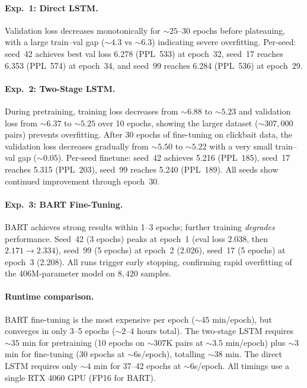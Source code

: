\documentclass{article}
\begin{document}
\paragraph{Exp.~1: Direct LSTM.}
Validation loss decreases monotonically for ${\sim}25$--30 epochs before plateauing, with a large train--val gap (${\sim}4.3$ vs ${\sim}6.3$) indicating severe overfitting.
Per-seed: seed~42 achieves best val loss 6.278 (PPL~533) at epoch~32, seed~17 reaches 6.353 (PPL~574) at epoch~34, and seed~99 reaches 6.284 (PPL~536) at epoch~29.

\paragraph{Exp.~2: Two-Stage LSTM.}
During pretraining, training loss decreases from ${\sim}6.88$ to ${\sim}5.23$ and validation loss from ${\sim}6.37$ to ${\sim}5.25$ over 10 epochs, showing the larger dataset (${\sim}307{,}000$ pairs) prevents overfitting.
After 30 epochs of fine-tuning on clickbait data, the validation loss decreases gradually from ${\sim}5.50$ to ${\sim}5.22$ with a very small train--val gap (${\sim}0.05$).
Per-seed finetune: seed~42 achieves 5.216 (PPL~185), seed~17 reaches 5.315 (PPL~203), seed~99 reaches 5.240 (PPL~189).
All seeds show continued improvement through epoch~30.

\paragraph{Exp.~3: BART Fine-Tuning.}
BART achieves strong results within 1--3 epochs; further training \emph{degrades} performance.
Seed~42 (3 epochs) peaks at epoch~1 (eval loss 2.038, then $2.171 \rightarrow 2.334$), seed~99 (5 epochs) at epoch~2 (2.026), seed~17 (5 epochs) at epoch~3 (2.208).
All runs trigger early stopping, confirming rapid overfitting of the 406M-parameter model on $8{,}420$ samples.

\paragraph{Runtime comparison.}
BART fine-tuning is the most expensive per epoch (${\sim}45$ min/epoch), but converges in only 3--5 epochs (${\sim}2$--$4$ hours total).
The two-stage LSTM requires ${\sim}35$ min for pretraining (10 epochs on ${\sim}307$K pairs at ${\sim}3.5$ min/epoch) plus ${\sim}3$ min for fine-tuning (30 epochs at ${\sim}6$s/epoch), totalling ${\sim}38$ min.
The direct LSTM requires only ${\sim}4$ min for 37--42 epochs at ${\sim}6$s/epoch.
All timings use a single RTX 4060 GPU (FP16 for BART).
\end{document}
